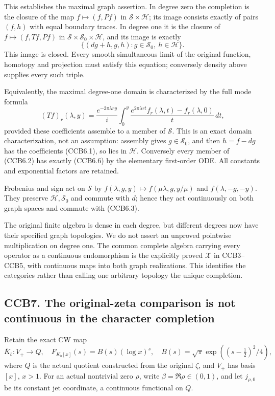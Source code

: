This establishes the maximal graph assertion. In degree zero the
completion is the closure of the map \(f\mapsto(f,Pf)\) in
\(\mathcal S\times\mathcal H\); its image consists exactly of pairs
\((f,h)\) with equal boundary traces. In degree one it is the closure of
\(f\mapsto(f,Tf,Pf)\) in
\(\mathcal S\times\mathcal S_0\times\mathcal H\), and its image is
exactly \[
\{(dg+h,g,h):g\in\mathcal S_0,\ h\in\mathcal H\}.
\tag{CCB6.5}
\] This image is closed. Every smooth simultaneous limit of the original
function, homotopy and projection must satisfy this equation; conversely
density above supplies every such triple.

Equivalently, the maximal degree-one domain is characterized by the full
mode formula \[
(Tf)_r(\lambda,y)
=\frac{e^{-2\pi\lambda ry}}{i}
\int_0^y
\frac{e^{2\pi\lambda rt}f_r(\lambda,t)-f_r(\lambda,0)}t\,dt,
\tag{CCB6.6}
\] provided these coefficients assemble to a member of \(\mathcal S\).
This is an exact domain characterization, not an assumption: assembly
gives \(g\in\mathcal S_0\), and then \(h=f-dg\) has the coefficients
(CCB6.1), so lies in \(\mathcal H\). Conversely every member of (CCB6.2)
has exactly (CCB6.6) by the elementary first-order ODE. All constants
and exponential factors are retained.

Frobenius and sign act on \(\mathcal S\) by
\(f(\lambda,g,y)\mapsto f(\mu\lambda,g,y/\mu)\) and
\(f(\lambda,-g,-y)\). They preserve \(\mathcal H,\mathcal S_0\) and
commute with \(d\); hence they act continuously on both graph spaces and
commute with (CCB6.3).

The original finite algebra is dense in each degree, but different
degrees now have their specified graph topologies. We do not assert an
unproved pointwise multiplication on degree one. The common complete
algebra carrying every operator as a continuous endomorphism is the
explicitly proved \(\mathcal X\) in CCB3--CCB5, with continuous maps
into both graph realizations. This identifies the categories rather than
calling one arbitrary topology the unique completion.

\subsection{CCB7. The original-zeta comparison is not continuous in the
character
completion}\label{ccb7.-the-original-zeta-comparison-is-not-continuous-in-the-character-completion}

Retain the exact CW map \[
\overline K_b:V_+\longrightarrow Q,\quad
F_{K_b[x]}(s)=B(s)(\log x)^s,\quad
B(s)=\sqrt\pi\exp((s-\tfrac12)^2/4),
\tag{CCB7.1}
\] where \(Q\) is the actual quotient constructed from the original
\(\zeta\), and \(V_+\) has basis \([x]\), \(x>1\). For an actual
nontrivial zero \(\rho\), write \(\beta=\Re\rho\in(0,1)\), and let
\(j_{\rho,0}\) be its constant jet coordinate, a continuous functional
on \(Q\).

